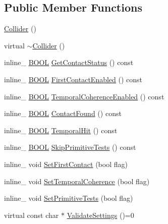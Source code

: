 \subsection*{Public Member Functions}
\begin{DoxyCompactItemize}
\item 
\hyperlink{classOpcode_1_1Collider_aa7186870221f868bbc74c3ae8609fa66}{Collider} ()
\item 
virtual \hyperlink{classOpcode_1_1Collider_a564acde9860f875a32a6638c573d87be}{$\sim$\+Collider} ()
\item 
inline\+\_\+ \hyperlink{IceTypes_8h_a050c65e107f0c828f856a231f4b4e788}{B\+O\+OL} \hyperlink{classOpcode_1_1Collider_a7d8c3e6a85be417ac7505930f14f141c}{Get\+Contact\+Status} () const 
\item 
inline\+\_\+ \hyperlink{IceTypes_8h_a050c65e107f0c828f856a231f4b4e788}{B\+O\+OL} \hyperlink{classOpcode_1_1Collider_ada64ad003b3a76368ef596eee435794e}{First\+Contact\+Enabled} () const 
\item 
inline\+\_\+ \hyperlink{IceTypes_8h_a050c65e107f0c828f856a231f4b4e788}{B\+O\+OL} \hyperlink{classOpcode_1_1Collider_ac50a74aa843f3c2d62e6a99403294f7d}{Temporal\+Coherence\+Enabled} () const 
\item 
inline\+\_\+ \hyperlink{IceTypes_8h_a050c65e107f0c828f856a231f4b4e788}{B\+O\+OL} \hyperlink{classOpcode_1_1Collider_a88f24122190d1e794733ea19e9f1fb8f}{Contact\+Found} () const 
\item 
inline\+\_\+ \hyperlink{IceTypes_8h_a050c65e107f0c828f856a231f4b4e788}{B\+O\+OL} \hyperlink{classOpcode_1_1Collider_a6ad315c31a59fe19ab443f11af8dd6c3}{Temporal\+Hit} () const 
\item 
inline\+\_\+ \hyperlink{IceTypes_8h_a050c65e107f0c828f856a231f4b4e788}{B\+O\+OL} \hyperlink{classOpcode_1_1Collider_a78992fbe3768af903cbb0b55d05e7894}{Skip\+Primitive\+Tests} () const 
\item 
inline\+\_\+ void \hyperlink{classOpcode_1_1Collider_a53c576522ae9d6043178501ca13a9de5}{Set\+First\+Contact} (bool flag)
\item 
inline\+\_\+ void \hyperlink{classOpcode_1_1Collider_abab8adce812c4ae0e59b023696c7719f}{Set\+Temporal\+Coherence} (bool flag)
\item 
inline\+\_\+ void \hyperlink{classOpcode_1_1Collider_a82b403f25c13aa1780a1b68a84347251}{Set\+Primitive\+Tests} (bool flag)
\item 
virtual const char $\ast$ \hyperlink{classOpcode_1_1Collider_a9099aa79f7b57fe4018f37e967cc6be5}{Validate\+Settings} ()=0
\end{DoxyCompactItemize}
